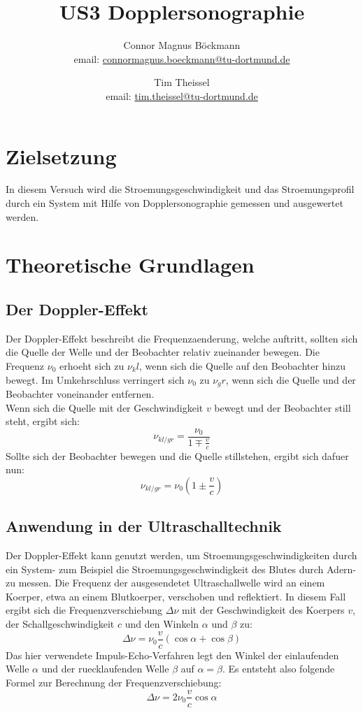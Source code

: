 \documentclass[titlepage=firstcover, captions=tableheading]{scrartcl}
\title{US3 Dopplersonographie}
\author{
Connor Magnus Böckmann \\ email: \href{mailto:connormagnus.boeckmann@tu-dortmund.de}{connormagnus.boeckmann@tu-dortmund.de}
\and Tim Theissel \\ email: \href{mailto:tim.theissel@tu-dortmund.de}{tim.theissel@tu-dortmund.de}}
\begin{document}
\maketitle
\newpage
\tableofcontents
\newpage
\section{Zielsetzung}
In diesem Versuch wird die Stroemungsgeschwindigkeit und das Stroemungsprofil durch ein System mit Hilfe von Dopplersonographie gemessen und ausgewertet werden. 
\section{Theoretische Grundlagen}
\subsection{Der Doppler-Effekt}
Der Doppler-Effekt beschreibt die Frequenzaenderung, welche auftritt, sollten sich die Quelle der Welle und der Beobachter relativ zueinander bewegen. Die Frequenz $\nu_0$ erhoeht sich zu $\nu_kl$, wenn sich die Quelle auf den Beobachter hinzu bewegt. Im Umkehrschluss verringert sich $\nu_0$ zu $\nu_gr$, wenn sich die Quelle und der Beobachter voneinander entfernen.\\
Wenn sich die Quelle mit der Geschwindigkeit $v$ bewegt und der Beobachter still steht, ergibt sich:
\begin{equation}
    \nu_{kl/gr}=\frac{\nu_0}{1\mp\frac{v}{c}}
\end{equation}
Sollte sich der Beobachter bewegen und die Quelle stillstehen, ergibt sich dafuer nun:
\begin{equation}
    \nu_{kl/gr}=\nu_0(1\pm\frac{v}{c})
\end{equation}
\subsection{Anwendung in der Ultraschalltechnik}
Der Doppler-Effekt kann genutzt werden, um Stroemungsgeschwindigkeiten durch ein System- zum Beispiel die Stroemungsgeschwindigkeit des Blutes durch Adern- zu messen. Die Frequenz der ausgesendetet Ultraschallwelle wird an einem Koerper, etwa an einem Blutkoerper, verschoben und reflektiert. In diesem Fall ergibt sich die Frequenzverschiebung $\Delta\nu$ mit der Geschwindigkeit des Koerpers $v$, der Schallgeschwindigkeit $c$ und den Winkeln $\alpha$ und $\beta$ zu:
\begin{equation}
    \Delta\nu=\nu_0\frac{v}{c}(\cos\alpha+\cos\beta)
\end{equation}
Das hier verwendete Impuls-Echo-Verfahren legt den Winkel der einlaufenden Welle $\alpha$ und der ruecklaufenden Welle $\beta$ auf $\alpha=\beta$. Es entsteht also folgende Formel zur Berechnung der Frequenzverschiebung:
\begin{equation}
    \Delta\nu=2\nu_0\frac{v}{c}\cos\alpha \label{4}
\end{equation} \newpage
\end{document}
